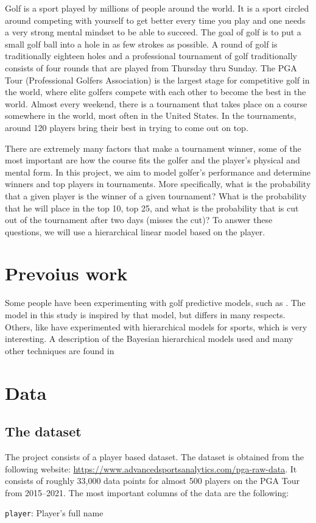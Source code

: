 \documentclass{article}\usepackage[]{graphicx}\usepackage[]{color}
\begin{document}
Golf is a sport played by millions of people around the world. It is a sport circled around competing with yourself to get better every time you play and one needs a very strong mental mindset to be able to succeed. The goal of golf is to put a small golf ball into a hole in as few strokes as possible. A round of golf is traditionally eighteen holes and a professional tournament of golf traditionally consists of four rounds that are played from Thursday thru Sunday. The PGA Tour (Professional Golfers Association) is the largest stage for competitive golf in the world, where elite golfers compete with each other to become the best in the world. Almost every weekend, there is a tournament that takes place on a course somewhere in the world, most often in the United States. In the tournaments, around 120 players bring their best in trying to come out on top.
\medskip\par
There are extremely many factors that make a tournament winner, some of the most important are how the course fits the golfer and the player's physical and mental form. In this project, we aim to model golfer's performance and determine winners and top players in tournaments. More specifically, what is the probability that a given player is the winner of a given tournament? What is the probability that he will place in the top 10, top 25, and what is the probability that is cut out of the tournament after two days (misses the cut)? To answer these questions, we will use a hierarchical linear model based on the player.

\section{Prevoius work}
Some people have been experimenting with golf predictive models, such as \cite{courchene_2018}. The model in this study is inspired by that model, but differs in many respects. Others, like \cite{inproceedings} have experimented with hierarchical models for sports, which is very interesting. A description of the Bayesian hierarchical models used and many other techniques are found in \cite{bda3}

\section{Data}
\subsection{The dataset}
The project consists of a player based dataset. The dataset is obtained from the following website: \url{https://www.advancedsportsanalytics.com/pga-raw-data}. It consists of roughly 33,000 data points for almost 500 players on the PGA Tour from 2015–2021. The most important columns of the data are the following:
\medskip\par
\hspace{4em}\verb$player$: Player's full name
\end{document}
